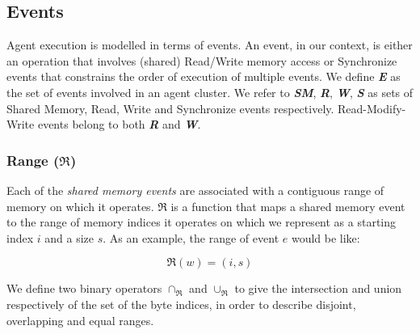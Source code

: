     
    \newcommand{\rmw}{\textit{rmw}\,}
    \newcommand{\set}[1]{\textbf{\textit{#1}}}

    \subsection{Events}
    Agent execution is modelled in terms of events. 
    An event, in our context, is either an operation that involves (shared) Read/Write memory access or Synchronize events that constrains the order of execution of multiple events. 
    We define \set{E} as the set of events involved in an agent cluster. 
    We refer to \set{SM}, \set{R}, \set{W}, \set{S} as sets of Shared Memory, Read, Write and Synchronize events respectively. Read-Modify-Write events belong to both \set{R} and \set{W}. 
       
        \subsubsection{Range ($\Re$)}
            Each of the \textit{shared memory events} are associated with a contiguous range of memory on which it operates. $\Re$ is a function that maps a shared memory event to the range of memory indices it operates on which we represent as a starting index $i$ and a size $s$. As an example, the range of event $e$ would be like: 
                    
                    \[\Re(w) = (i, s) \]
           
           
            We define two binary operators $\cap_\Re$ and $\cup_\Re$ to give the intersection and union respectively of the set of the byte indices, in order to describe disjoint, overlapping and equal ranges.  
            
